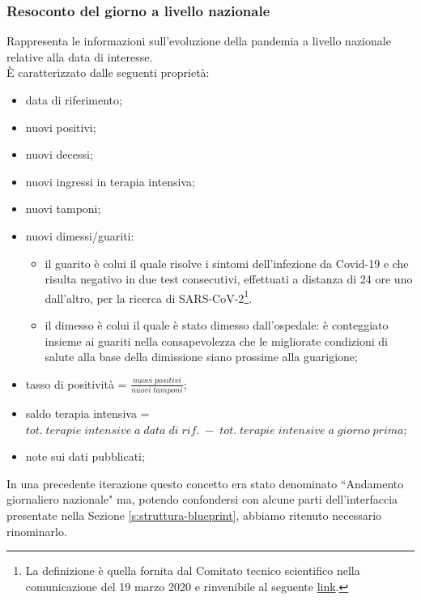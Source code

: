 \subsubsection{Resoconto del giorno a livello nazionale}
\label{sss:resoconto-del-giorno-livello-nazionale}
Rappresenta le informazioni sull'evoluzione della pandemia a livello nazionale relative alla data di interesse.\\
È caratterizzato dalle seguenti proprietà:
\begin{itemize}
    \item data di riferimento;
    \item nuovi positivi;
    \item nuovi decessi;
    \item nuovi ingressi in terapia intensiva;
    \item nuovi tamponi;
    \item nuovi dimessi/guariti:
    \begin{itemize}
        \item il guarito è colui il quale risolve i sintomi dell’infezione da Covid-19 e che risulta negativo in due test consecutivi, effettuati a distanza di 24 ore uno dall’altro, per la ricerca di SARS-CoV-2\footnote{La definizione è quella fornita dal Comitato tecnico scientifico nella comunicazione del 19 marzo 2020 e rinvenibile al seguente \href{http://www.salute.gov.it/portale/nuovocoronavirus/dettaglioNotizieNuovoCoronavirus.jsp?lingua=italiano&menu=notizie&p=dalministero&id=4274}{link}.}.
        \item il dimesso è colui il quale è stato dimesso dall'ospedale: è conteggiato insieme ai guariti nella consapevolezza che le migliorate condizioni di salute alla base della dimissione siano prossime alla guarigione;
    \end{itemize}
    \item tasso di positività = $\frac{nuovi \; positivi}{nuovi \; tamponi}$;
    \item saldo terapia intensiva = $tot. \; terapie \; intensive \; a \; data \; di \; rif. \; - \; tot. \; terapie \; intensive \; a \; giorno \; prima$;
    \item note sui dati pubblicati;
\end{itemize}
In una precedente iterazione questo concetto era stato denominato ``Andamento giornaliero nazionale" ma, potendo confondersi con alcune parti dell'interfaccia presentate nella Sezione \ref{s:struttura-blueprint}, abbiamo ritenuto necessario rinominarlo.

